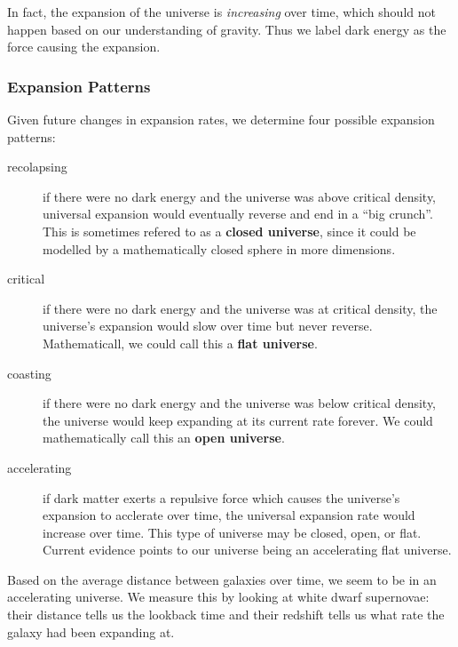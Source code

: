 In fact, the expansion of the universe is {\it increasing} over time, which should not happen based on our understanding of gravity. Thus we label dark energy as the force causing the expansion.

\subsubsection{Expansion Patterns}
Given future changes in expansion rates, we determine four possible expansion patterns:
\begin{description}
\item[recolapsing] if there were no dark energy and the universe was above critical density, universal expansion would eventually reverse and end in a ``big crunch''. This is sometimes refered to as a {\bf closed universe}, since it could be modelled by a mathematically closed sphere in more dimensions.
\item[critical] if there were no dark energy and the universe was at critical density, the universe's expansion would slow over time but never reverse. Mathematicall, we could call this a {\bf flat universe}.
\item[coasting] if there were no dark energy and the universe was below critical density, the universe would keep expanding at its current rate forever. We could mathematically call this an {\bf open universe}.
\item[accelerating] if dark matter exerts a repulsive force which causes the universe's expansion to acclerate over time, the universal expansion rate would increase over time. This type of universe may be closed, open, or flat. Current evidence points to our universe being an accelerating flat universe.
\end{description}

Based on the average distance between galaxies over time, we seem to be in an accelerating universe. We measure this by looking at white dwarf supernovae: their distance tells us the lookback time and their redshift tells us what rate the galaxy had been expanding at.
